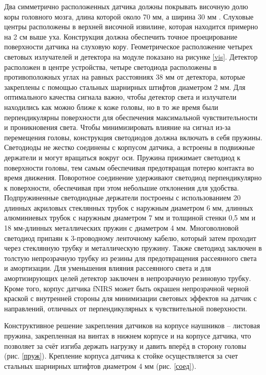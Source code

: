 Два симметрично расположенных датчика должны покрывать височную долю коры головного мозга, длина которой около 70 мм, а ширина 30 мм \cite{litlink11}. Слуховые центры расположены в верхней височной извилине, которая находится примерно на 2 см выше уха. Конструкция должна обеспечить точное проецирование поверхности датчика на слуховую кору. Геометрическое расположение четырех световых излучателей и детектора на модуле показано на рисунке \ref{vis}. Детектор расположен в центре устройства, четыре светодиода расположены в противоположных углах на равных расстояниях 38 мм от детектора, которые закреплены с помощью стальных шарнирных штифтов диаметром 2 мм. Для оптимального качества сигнала важно, чтобы детектор света и излучатели находились как можно ближе к коже головы, но в то же время были перпендикулярны поверхности для обеспечения максимальной чувствительности и проникновения света. Чтобы  минимизировать влияние на сигнал из-за перемещения головы, конструкция светодиодов должна включать в себя пружины. Светодиоды не жестко соединены с корпусом датчика, а встроены в подвижные держатели и могут вращаться вокруг оси. Пружина прижимает светодиод к поверхности головы, тем самым обеспечивая предотвращая потерю контакта во время движения. Поворотное соединение удерживают светодиод перпендикулярно к поверхности, обеспечивая при этом небольшие отклонения для удобства. Подпружиненные светодиодные держатели построены с использованием 20 длинных акриловых стеклянных трубок с наружным диаметром 6 мм, длинных алюминиевых трубок с наружным диаметром 7 мм и толщиной стенки 0,5 мм и 18 мм-длинных металлических пружин с диаметром 4 мм. Многоволновой светодиод припаян к 3-проводному ленточному кабелю, который затем проходит через стеклянную трубку и металлическую пружину. Также светодиод заключен в толстую непрозрачную трубку из резины для предотвращения рассеянного света и амортизации. Для уменьшения влияния рассеянного света и для амортизирующих целей детектор заключен в непрозрачную резиновую трубку. Кроме того, корпус датчика fNIRS может быть окрашен непрозрачной черной краской с внутренней стороны для минимизации световых эффектов на датчик с направлений, отличных от перпендикулярных к чувствительной поверхности. 

Конструктивное решение закрепления датчиков на корпусе наушников – листовая пружина, закрепленная на винтах в нижнем корпусе и на корпусе датчика, что позволяет за счёт изгиба держать нагрузку и давить вперёд в сторону головы (рис. \ref{пруж}). Крепление корпуса датчика к стойке осуществляется за счет стальных шарнирных штифтов диаметром 4 мм (рис. \ref{соед}).

